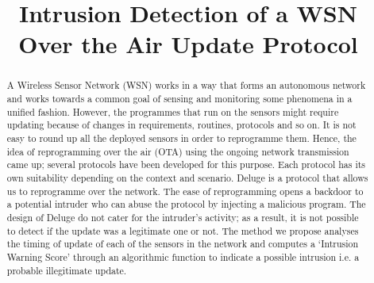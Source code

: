\documentclass[conference,man]{IEEEtran}
\begin{document}
\title{Intrusion Detection of a WSN\\Over the Air Update Protocol}

\author{
}


\maketitle

\begin{abstract}


A Wireless Sensor Network (WSN) works in a way that forms an autonomous network and works towards a common goal of sensing and monitoring some phenomena in a unified fashion. 
However, the programmes that run on the sensors might require updating because of changes in requirements, routines, protocols and so on. 
It is not easy to round up all the deployed sensors in order to reprogramme them. 
Hence, the idea of reprogramming over the air (OTA) using the ongoing network transmission came up; several protocols have been developed for this purpose. 
Each protocol has its own suitability depending on the context and scenario.
Deluge is a protocol that allows us to reprogramme over the network. 
The ease of reprogramming opens a backdoor to a potential intruder who can abuse the protocol by injecting a malicious program. 
The design of Deluge do not cater for the intruder's activity; as a result, it is not possible to detect if the update was a legitimate one or not. 
The method we propose analyses the timing of update of each of the sensors in the network and computes a `Intrusion Warning Score' through an algorithmic function to indicate a possible intrusion i.e. a probable illegitimate update. 

\end{abstract}
\end{document}
